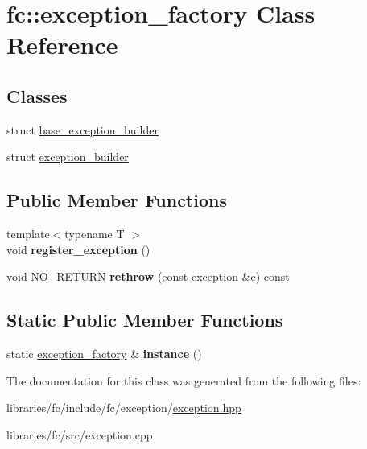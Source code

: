 \hypertarget{classfc_1_1exception__factory}{}\section{fc\+:\+:exception\+\_\+factory Class Reference}
\label{classfc_1_1exception__factory}
\subsection*{Classes}
\begin{DoxyCompactItemize}
\item 
struct \mbox{\hyperlink{structfc_1_1exception__factory_1_1base__exception__builder}{base\+\_\+exception\+\_\+builder}}
\item 
struct \mbox{\hyperlink{structfc_1_1exception__factory_1_1exception__builder}{exception\+\_\+builder}}
\end{DoxyCompactItemize}
\subsection*{Public Member Functions}
\begin{DoxyCompactItemize}
\item 
\mbox{\label{classfc_1_1exception__factory_a59581ba21d7c93104a43a0f5fed3cc9d}} 
{\footnotesize template$<$typename T $>$ }\\void {\bfseries register\+\_\+exception} ()
\item 
\mbox{\label{classfc_1_1exception__factory_a61092b88bfa736748a4fcb860b18e5b2}} 
void N\+O\+\_\+\+R\+E\+T\+U\+RN {\bfseries rethrow} (const \mbox{\hyperlink{classfc_1_1exception}{exception}} \&e) const
\end{DoxyCompactItemize}
\subsection*{Static Public Member Functions}
\begin{DoxyCompactItemize}
\item 
\mbox{\label{classfc_1_1exception__factory_a98c69539dde9e427e2b68c3a77c6e03c}} 
static \mbox{\hyperlink{classfc_1_1exception__factory}{exception\+\_\+factory}} \& {\bfseries instance} ()
\end{DoxyCompactItemize}


The documentation for this class was generated from the following files\+:\begin{DoxyCompactItemize}
\item 
libraries/fc/include/fc/exception/\mbox{\hyperlink{exception_8hpp}{exception.\+hpp}}\item 
libraries/fc/src/exception.\+cpp\end{DoxyCompactItemize}
